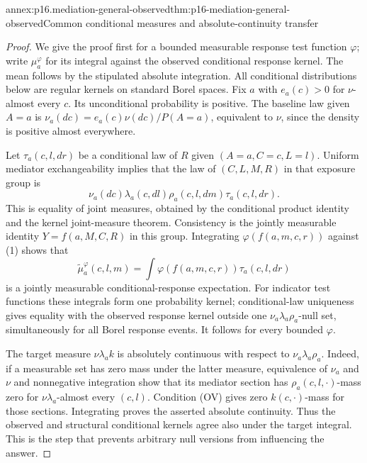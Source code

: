 \begin{annexitem}{annex:p16.mediation-general-observed}{thm:p16-mediation-general-observed}{Common conditional measures and absolute-continuity transfer}
\begin{proof}
We give the proof first for a bounded measurable response test function
\(\varphi\); write \(\mu_a^\varphi\) for its integral against the observed
conditional response kernel. The mean follows by the stipulated absolute integration.
All conditional distributions below are regular kernels on standard
Borel spaces. Fix \(a\) with \(e_a(c)>0\) for \(\nu\)-almost every
\(c\). Its unconditional probability is positive. The baseline law
given \(A=a\) is \(\nu_a(dc)=e_a(c)\nu(dc)/P(A=a)\), equivalent
to \(\nu\), since the density is positive almost everywhere.

Let \(\tau_a(c,l,dr)\) be a conditional law of \(R\) given
\((A=a,C=c,L=l)\). Uniform mediator exchangeability implies that
the law of \((C,L,M,R)\) in that exposure group is
\[
 \nu_a(dc)\lambda_a(c,dl)\rho_a(c,l,dm)\tau_a(c,l,dr).       \tag{1}
\]
This is equality of joint measures, obtained by the conditional product
identity and the kernel joint-measure theorem. Consistency is the
jointly measurable identity \(Y=f(a,M,C,R)\) in this group. Integrating
\(\varphi(f(a,m,c,r))\) against (1) shows that
\[
 \widetilde\mu_a^\varphi(c,l,m)
   =\int\varphi(f(a,m,c,r))\tau_a(c,l,dr)
\]
is a jointly measurable conditional-response expectation. For indicator
test functions these integrals form one probability kernel; conditional-law
uniqueness gives equality with the observed response kernel outside one
\(\nu_a\lambda_a\rho_a\)-null set, simultaneously for all Borel response
events. It follows for every bounded \(\varphi\).

The target measure \(\nu\lambda_a k\) is absolutely continuous with
respect to \(\nu_a\lambda_a\rho_a\). Indeed, if a measurable set has
zero mass under the latter measure, equivalence of \(\nu_a\) and
\(\nu\) and nonnegative integration show that its mediator section
has \(\rho_a(c,l,\cdot)\)-mass zero for \(\nu\lambda_a\)-almost every
\((c,l)\). Condition (OV) gives zero \(k(c,\cdot)\)-mass for those
sections. Integrating proves the asserted absolute continuity. Thus
the observed and structural conditional kernels agree also under the
target integral. This is the step that prevents arbitrary null versions
from influencing the answer.


\end{proof}
\end{annexitem}
